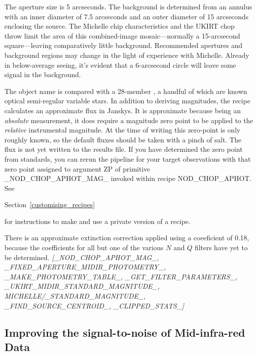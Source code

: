 \documentclass[twoside,11pt,nolof]{starlink}
\begin{document}
The aperture size is 5 arcseconds.  The background is determined
from an annulus with an inner diameter of 7.5 arcseconds and an
outer diameter of 15 arcseconds enclosing the source.  The Michelle chip
characteristics and the UKIRT chop throw limit the area of this
combined-image mosaic---normally a 15-arcsecond square---leaving
comparatively little background.  Recommended apertures and background
regions may change in the light of experience with Michelle.  Already
in below-average seeing, it's evident that a 6-arcsecond circle will
leave some signal in the background.

The object name is compared with a 28-member ,
a handful of which are known optical semi-regular variable stars.  In
addition to deriving magnitudes, the recipe calculates an approximate
flux in Janskys.  It is approximate because being an \emph{absolute}
measurement, it does require a magnitude zero point to be applied to
the \emph{relative} instrumental magnitude. At the time of writing this
zero-point is only roughly known, so the default fluxes should be
taken with a pinch of salt.  The flux is not yet written to the
results file.  If you have determined the zero point from standards,
you can rerun the pipeline for your target observations with that zero
point assigned to argument ZP of primitive \_NOD\_CHOP\_APHOT\_MAG\_
invoked within recipe NOD\_CHOP\_APHOT.  See
\begin{latexonly}
Section~\ref{customising_recipes}
\end{latexonly}


for instructions to make and use a private version of a recipe.

There is an approximate extinction correction applied using a
coeeficient of 0.18, because the coefficients for all but one of the
various $N$ and $Q$ filters have yet to be determined.
\newline \emph{[\_NOD\_CHOP\_APHOT\_MAG\_, \_FIXED\_APERTURE\_MIDIR\_PHOTOMETRY\_,\\
\_MAKE\_PHOTOMETRY\_TABLE\_, \_GET\_FILTER\_PARAMETERS\_,\\
\_UKIRT\_MIDIR\_STANDARD\_MAGNITUDE\_, MICHELLE/\_STANDARD\_MAGNITUDE\_,
\_FIND\_SOURCE\_CENTROID\_, \_CLIPPED\_STATS\_]}

\subsection{Improving
the signal-to-noise of Mid-infra-red
Data\label{improving_the_signal-to-noise_of_mid-infra-red_data}}
\end{document}
